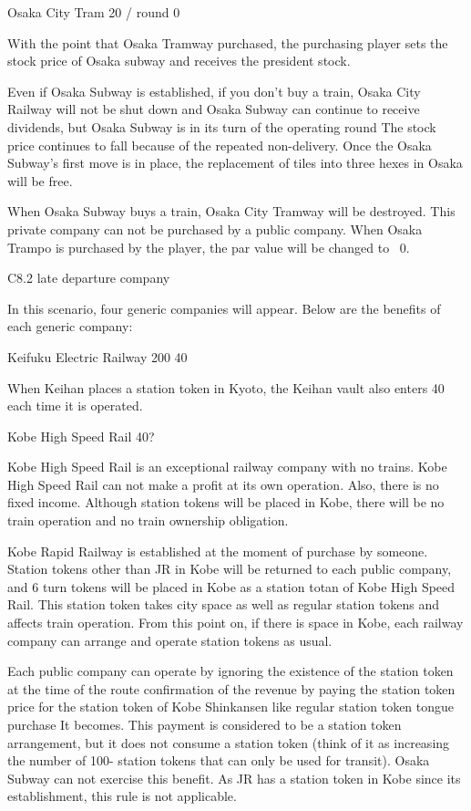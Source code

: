 \documentclass{article}
\begin{document}
\begin{CJK}{UTF8}{min}
Osaka City Tram 20 / round 0

With the point that Osaka Tramway purchased, the purchasing player sets the stock price of Osaka subway and receives the president stock.

Even if Osaka Subway is established, if you don't buy a train, Osaka City Railway will not be shut down and Osaka Subway can continue to receive dividends, but Osaka Subway is in its turn of the operating round The stock price continues to fall because of the repeated non-delivery. Once the Osaka Subway's first move is in place, the replacement of tiles into three hexes in Osaka will be free.

When Osaka Subway buys a train, Osaka City Tramway will be destroyed. This private company can not be purchased by a public company. When Osaka Trampo is purchased by the player, the par value will be changed to \ 0.

C8.2 late departure company

In this scenario, four generic companies will appear. Below are the benefits of each generic company:

Keifuku Electric Railway 200 40

When Keihan places a station token in Kyoto, the Keihan vault also enters 40 each time it is operated.

Kobe High Speed ​​Rail 40?

Kobe High Speed ​​Rail is an exceptional railway company with no trains. Kobe High Speed ​​Rail can not make a profit at its own operation. Also, there is no fixed income. Although station tokens will be placed in Kobe, there will be no train operation and no train ownership obligation.

Kobe Rapid Railway is established at the moment of purchase by someone. Station tokens other than JR in Kobe will be returned to each public company, and 6 turn tokens will be placed in Kobe as a station totan of Kobe High Speed ​​Rail. This station token takes city space as well as regular station tokens and affects train operation. From this point on, if there is space in Kobe, each railway company can arrange and operate station tokens as usual.

Each public company can operate by ignoring the existence of the station token at the time of the route confirmation of the revenue by paying the station token price for the station token of Kobe Shinkansen like regular station token tongue purchase It becomes. This payment is considered to be a station token arrangement, but it does not consume a station token (think of it as increasing the number of 100- station tokens that can only be used for transit). Osaka Subway can not exercise this benefit. As JR has a station token in Kobe since its establishment, this rule is not applicable.


\end{CJK}
\end{document}
